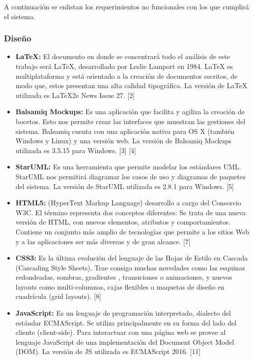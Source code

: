 A continuación se enlistan los requerimientos no funcionales con los que cumplirá el sistema.

\subsubsection{Diseño}

\begin{itemize}
	\item \textbf{LaTeX:} El documento en donde se concentrará todo el análisis de este trabajo será LaTeX, desarrollado por Leslie Lamport en 1984. LaTeX es multiplataforma y está orientado a la creación de documentos escritos, de modo que, estos  presentan una alta calidad tipográfica. La versión de LaTeX utilizada es LaTeX2e News Issue 27. [2]
	
	\item \textbf{Balsamiq Mockups:} Es una aplicación que facilita y agiliza la creación de bocetos. Esto nos permite crear las interfaces que muestran las gestiones del sistema. Balsamiq cuenta con una aplicación nativa para OS X (también Windows y Linux) y una versión web. La versión de Balsamiq Mockups utilizada es 3.5.15 para Windows. [3] [4]
	
	\item \textbf{StarUML:} Es una herramienta que permite modelar los estándares UML. StarUML nos permitirá diagramar los casos de uso y diagramas de paquetes del sistema. La versión de StarUML utilizada es 2.8.1 para Windows. [5]
	
	\item \textbf{HTML5:} (HyperText Markup Language) desarrollo a cargo del Consorcio W3C. El término representa dos conceptos diferentes: Se trata de una nueva versión de HTML, con nuevos elementos, atributos y comportamientos. Contiene un conjunto más amplio de tecnologías que permite a los sitios Web y a las aplicaciones ser más diversas y de gran alcance. [7]
	
	\item \textbf{CSS3:} Es la última evolución del lenguaje de las Hojas de Estilo en Cascada (Cascading Style Sheets). Trae consigo muchas novedades como las esquinas redondeadas, sombras, gradientes , transiciones o animaciones, y nuevos layouts como multi-columnas, cajas flexibles o maquetas de diseño en cuadrícula (grid layouts). [8]
	
	\item \textbf{JavaScript:} Es un lenguaje de programación interpretado, dialecto del estándar ECMAScript. Se utiliza principalmente en su forma del lado del cliente (client-side). Para interactuar con una página web se provee al lenguaje JavaScript de una implementación del Document Object Model (DOM). La versión de JS utilizada es ECMAScript 2016. [11]
	

\end{itemize}
